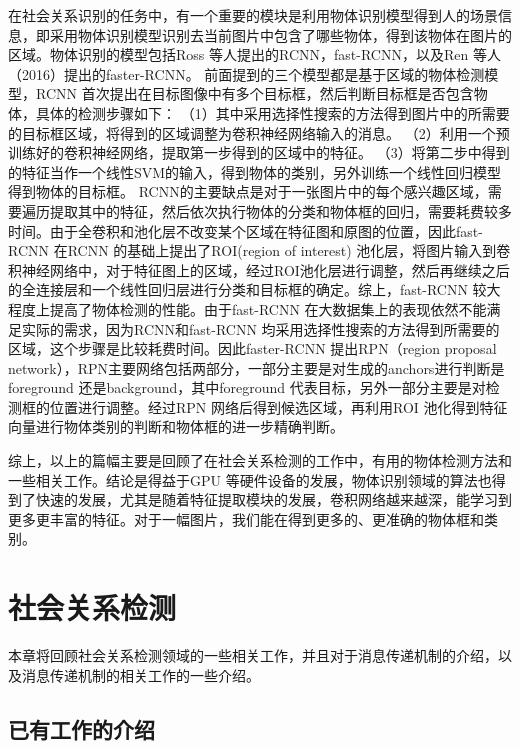 在社会关系识别的任务中，有一个重要的模块是利用物体识别模型得到人的场景信息，即采用物体识别模型识别去当前图片中包含了哪些物体，得到该物体在图片的区域。物体识别的模型包括Ross 等人提出的RCNN\cite{girshick2014rich}，fast-RCNN\cite{girshick2015fast}，以及Ren 等人（2016）\cite{ren2015faster}提出的faster-RCNN。 前面提到的三个模型都是基于区域的物体检测模型，RCNN\cite{girshick2014rich} 首次提出在目标图像中有多个目标框，然后判断目标框是否包含物体，具体的检测步骤如下：
（1）其中采用选择性搜索的方法得到图片中的所需要的目标框区域，将得到的区域调整为卷积神经网络输入的消息。
（2）利用一个预训练好的卷积神经网络，提取第一步得到的区域中的特征。
（3）将第二步中得到的特征当作一个线性SVM的输入，得到物体的类别，另外训练一个线性回归模型得到物体的目标框。
RCNN的主要缺点是对于一张图片中的每个感兴趣区域，需要遍历提取其中的特征，然后依次执行物体的分类和物体框的回归，需要耗费较多时间。由于全卷积和池化层不改变某个区域在特征图和原图的位置，因此fast-RCNN 在RCNN 的基础上提出了ROI(region of interest) 池化层，将图片输入到卷积神经网络中，对于特征图上的区域，经过ROI池化层进行调整，然后再继续之后的全连接层和一个线性回归层进行分类和目标框的确定。综上，fast-RCNN 较大程度上提高了物体检测的性能。由于fast-RCNN 在大数据集上的表现依然不能满足实际的需求，因为RCNN和fast-RCNN 均采用选择性搜索的方法得到所需要的区域，这个步骤是比较耗费时间。因此faster-RCNN 提出RPN（region proposal network），RPN主要网络包括两部分，一部分主要是对生成的anchors进行判断是foreground 还是background，其中foreground 代表目标，另外一部分主要是对检测框的位置进行调整。经过RPN 网络后得到候选区域，再利用ROI 池化得到特征向量进行物体类别的判断和物体框的进一步精确判断。


综上，以上的篇幅主要是回顾了在社会关系检测的工作中，有用的物体检测方法和一些相关工作。结论是得益于GPU 等硬件设备的发展，物体识别领域的算法也得到了快速的发展，尤其是随着特征提取模块的发展，卷积网络越来越深，能学习到更多更丰富的特征。对于一幅图片，我们能在得到更多的、更准确的物体框和类别。

\section{社会关系检测}
本章将回顾社会关系检测领域的一些相关工作，并且对于消息传递机制的介绍，以及消息传递机制的相关工作的一些介绍。

\subsection{已有工作的介绍}

